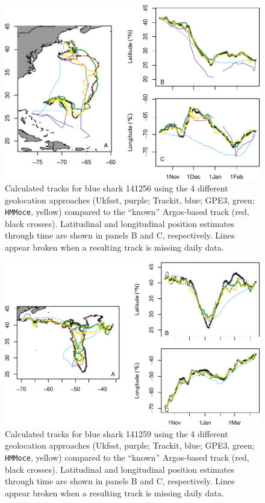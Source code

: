 \clearpage

\begin{figure}[p]
\centering
\includegraphics[width=1\textwidth]{images/A1_Fig3.pdf}
\caption[Comparison of track methods for blue shark 141256]{Calculated tracks for blue shark 141256
using the 4 different geolocation approaches (Ukfsst, purple; Trackit,
blue; GPE3, green; \texttt{HMMoce}, yellow) compared to the ``known''
Argos-based track (red, black crosses). Latitudinal and longitudinal
position estimates through time are shown in panels B and C,
respectively. Lines appear broken when a resulting track is missing
daily data.}
\label{fig:a1f3}
\end{figure}

\clearpage

\begin{figure}[p]
\centering
\includegraphics[width=1\textwidth]{images/A1_Fig4.pdf}
\caption[Comparison of track methods for blue shark 141259]{Calculated tracks for blue shark 141259
using the 4 different geolocation approaches (Ukfsst, purple; Trackit,
blue; GPE3, green; \texttt{HMMoce}, yellow) compared to the ``known''
Argos-based track (red, black crosses). Latitudinal and longitudinal
position estimates through time are shown in panels B and C,
respectively. Lines appear broken when a resulting track is missing
daily data.}
\label{fig:a1f4}
\end{figure}

